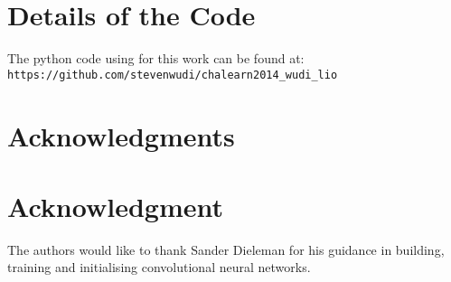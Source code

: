 \documentclass[10pt,journal,compsoc]{IEEEtran}
\begin{document}
\appendices
\section{Details of the Code}
The python code using for this work can be found at: \\
\footnotesize{\verb+https://github.com/stevenwudi/chalearn2014_wudi_lio+}


\ifCLASSOPTIONcompsoc
  \section*{Acknowledgments}
\else
  \section*{Acknowledgment}
\fi

The authors would like to thank Sander Dieleman for his guidance in building, training and initialising convolutional neural networks.





\newpage

\newpage


\end{document}

